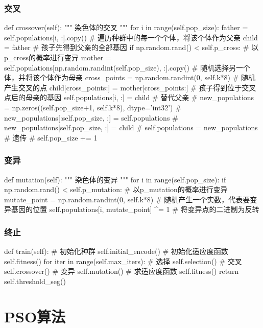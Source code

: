 \documentclass{article}
\begin{document}
\subsubsection{交叉}
\begin{python}
    def crossover(self):
        """
        染色体的交叉
        """
        for i in range(self.pop_size):
            father = self.populations[i, :].copy()  # 遍历种群中的每一个个体，将该个体作为父亲
            child = father  # 孩子先得到父亲的全部基因
            if np.random.rand() < self.p_cross:  # 以p_cross的概率进行变异
                mother = self.populations[np.random.randint(self.pop_size), :].copy()  # 随机选择另一个体，并将该个体作为母亲
                cross_points = np.random.randint(0, self.k*8)  # 随机产生交叉的点
                child[cross_points:] = mother[cross_points:]  # 孩子得到位于交叉点后的母亲的基因
            self.populations[i, :] = child  # 替代父亲
            # new_populations = np.zeros((self.pop_size+1, self.k*8), dtype='int32')
            # new_populations[:self.pop_size, :] = self.populations
            # new_populations[self.pop_size, :] = child
            # self.populations = new_populations  # 遗传
            # self.pop_size += 1
\end{python}
\subsubsection{变异}
\begin{python}
    def mutation(self):
        """
        染色体的变异
        """
        for i in range(self.pop_size):
            if np.random.rand() < self.p_mutation:  # 以p_mutation的概率进行变异
                mutate_point = np.random.randint(0, self.k*8)  # 随机产生一个实数，代表要变异基因的位置
                self.populations[i, mutate_point] ^= 1  # 将变异点的二进制为反转
\end{python}
\subsubsection{终止}
\begin{python}
	def train(self):
		 # 初始化种群
		 self.initial_encode()
		 # 初始化适应度函数
		 self.fitness()
		 for iter in range(self.max_iters):
		 	 # 选择
		 	 self.selection()
		 	 # 交叉
		 	 self.crossover()
		 	 # 变异
		 	 self.mutation()
		 	 # 求适应度函数
		 	 self.fitness()
	  	 	 return self.threshold_seg()
\end{python}
\section{PSO算法}
\end{document}
